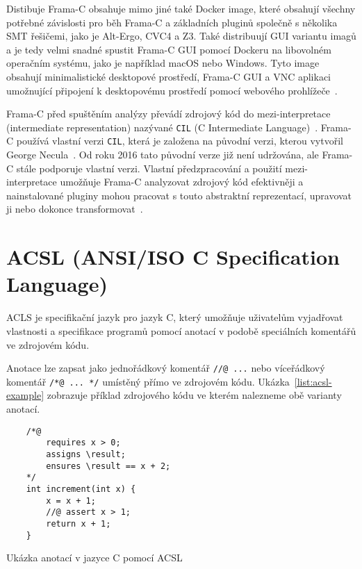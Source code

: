 Distibuje Frama\mbox{-}C obsahuje mimo jiné také Docker image, které obsahují všechny potřebné závislosti
pro běh Frama\mbox{-}C a základních pluginů společně s několika SMT řešičemi, jako je Alt-Ergo, CVC4 a Z3.
Také distribuují GUI variantu imagů a je tedy velmi snadné spustit Frama\mbox{-}C GUI pomocí Dockeru na libovolném operačním systému,
jako je například macOS nebo Windows.
Tyto image obsahují minimalistické desktopové prostředí, Frama\mbox{-}C GUI a VNC aplikaci
umožnující připojení k desktopovému prostředí pomocí webového prohlížeče~\cite{FCDockerGUIMaroneze2021}.


Frama\mbox{-}C před spuštěním analýzy převádí zdrojový kód do mezi-interpretace (intermediate representation)
nazývané \texttt{CIL} (C Intermediate Language)~\cite{BlanchardACSL2024}.
Frama\mbox{-}C používá vlastní verzi \texttt{CIL}, která je založena na původní verzi, kterou vytvořil George Necula~\cite{Necula2002CIL}.
Od roku 2016 tato původní verze již není udržována, ale Frama\mbox{-}C stále podporuje vlastní verzi.
Vlastní předzpracování a použití mezi-interpretace umožňuje Frama\mbox{-}C
analyzovat zdrojový kód efektivněji a nainstalované pluginy mohou pracovat
s touto abstraktní reprezentací, upravovat ji nebo dokonce transformovat~\cite{FCKernelMaroneze2024}.

\section{ACSL (ANSI/ISO C Specification Language)}
\label{sec:acsl}

ACLS je specifikační jazyk pro jazyk C, který umožňuje uživatelům
vyjadřovat vlastnosti a specifikace programů pomocí anotací v podobě speciálních komentářů ve zdrojovém kódu.

Anotace lze zapsat jako jednořádkový komentář \texttt{//@ ...} nebo víceřádkový komentář \texttt{/*@ ... */} umístěný přímo ve zdrojovém kódu.
Ukázka~\ref{list:acsl-example} zobrazuje příklad zdrojového kódu ve kterém nalezneme obě varianty anotací.

\begin{listing}[H]
    \begin{verbatim}
    /*@
        requires x > 0;
        assigns \result;
        ensures \result == x + 2;
    */
    int increment(int x) {
        x = x + 1;
        //@ assert x > 1;
        return x + 1;
    }
    \end{verbatim}
    \caption{Ukázka anotací v jazyce C pomocí ACSL}
    \label{list:acsl-example}
\end{listing}

